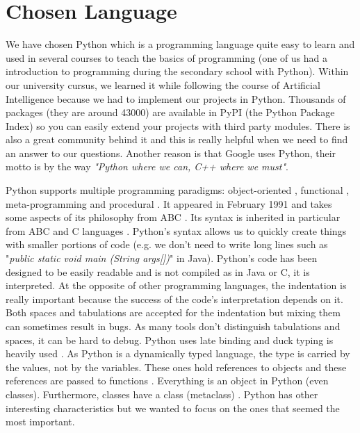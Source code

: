 \section{Chosen Language}
We have chosen Python which is a programming language quite easy to learn and used in several courses to teach the basics of programming (one of us had a introduction to programming during the secondary school with Python). Within our university cursus, we learned it while following the course of Artificial Intelligence because we had to implement our projects in Python. Thousands of packages (they are around 43000) are available in PyPI (the Python Package Index) so you can easily extend your projects with third party modules. There is also a great community behind it and this is really helpful when we need to find an answer to our questions. Another reason is that Google uses Python, their motto is by the way \textit{"Python where we can, C++ where we must"}.
\newline

Python supports multiple programming paradigms: object-oriented \cite{martelli2006python} \cite{functional_doc}, functional \cite{functional_doc} \cite{devtome}, meta-programming \cite{mihai} and procedural \cite{martelli2006python} \cite{functional_doc}.
It appeared in February 1991 and takes some aspects of its philosophy from ABC \cite{python_why}. Its syntax is inherited in particular from ABC and C languages \cite{wikipediaEN_history_python}. Python's syntax allows us to quickly create things with smaller portions of code (e.g. we don't need to write long lines such as "\textit{public static void main (String args[])}" in Java).
Python's code has been designed to be easily readable \cite{ZenPython} and is not compiled as in Java or C, it is interpreted.
At the opposite of other programming languages, the indentation is really important because the success of the code's interpretation depends on it. Both spaces and tabulations are accepted for the indentation but mixing them can sometimes result in bugs. As many tools don't distinguish tabulations and spaces, it can be hard to debug.
Python uses late binding \cite{python_pep0289} and duck typing is heavily used \cite{wikipediaEN_duck_typing_python}.
As Python is a dynamically typed language, the type is carried by the values, not by the variables. These ones hold references to objects and these references are passed to functions \cite{wikipediaEN_python_syntax_semantics}.
Everything is an object in Python (even classes). Furthermore, classes have a class (metaclass) \cite{python_datamodel}.
Python has other interesting characteristics but we wanted to focus on the ones that seemed the most important.
\newline

